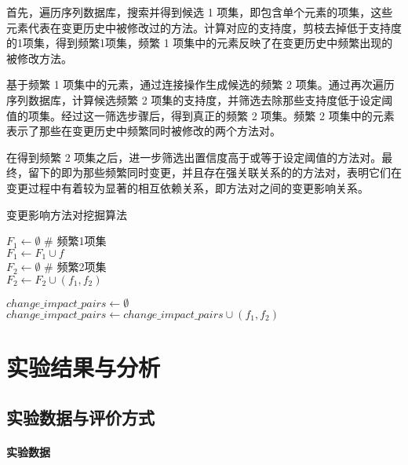 首先，遍历序列数据库，搜索并得到候选 1 项集，即包含单个元素的项集，这些元素代表在变更历史中被修改过的方法。计算对应的支持度，剪枝去掉低于支持度的1项集，得到频繁1项集，频繁 1 项集中的元素反映了在变更历史中频繁出现的被修改方法。

基于频繁 1 项集中的元素，通过连接操作生成候选的频繁 2 项集。通过再次遍历序列数据库，计算候选频繁 2 项集的支持度，并筛选去除那些支持度低于设定阈值的项集。经过这一筛选步骤后，得到真正的频繁 2 项集。频繁 2 项集中的元素表示了那些在变更历史中频繁同时被修改的两个方法对。

在得到频繁 2 项集之后，进一步筛选出置信度高于或等于设定阈值的方法对。最终，留下的即为那些频繁同时变更，并且存在强关联关系的的方法对，表明它们在变更过程中有着较为显著的相互依赖关系，即方法对之间的变更影响关系。

\begin{algorithm}
\caption{变更影响方法对挖掘算法}
\begin{algorithmic}
\State $F_1 \gets \emptyset$  \# 频繁1项集\\  
 {
     {
        $F_1 \gets F_1 \cup f$
    }
} \\
\State $F_2 \gets \emptyset$  \# 频繁2项集\\ 
 {
     {
        $F_2 \gets F_2 \cup (f_1, f_2)$
    }
}

\State $change\_impact\_pairs \gets \emptyset$ \\ 
 {
     {
        $change\_impact\_pairs \gets change\_impact\_pairs \cup (f_1, f_2)$
    }
}
\end{algorithmic}
\end{algorithm}
    


\section{实验结果与分析}

\subsection{实验数据与评价方式}

\paragraph{实验数据}

